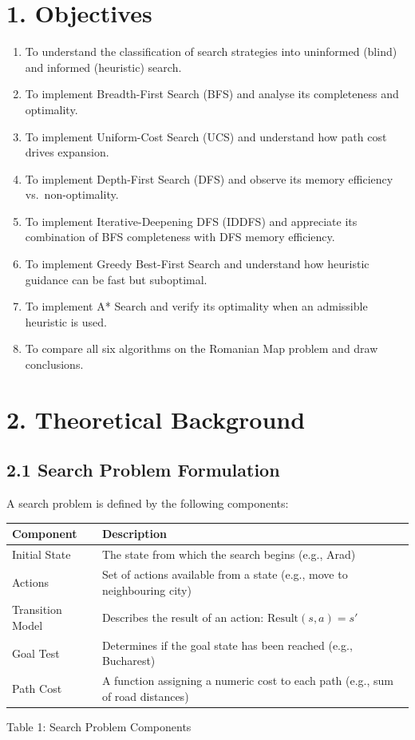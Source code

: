 \documentclass[12pt,a4paper]{article}
\begin{document}
\section*{1. Objectives}

\begin{enumerate}[leftmargin=1.6em]
  \item To understand the classification of search strategies into uninformed (blind) and informed (heuristic) search.
  \item To implement Breadth-First Search (BFS) and analyse its completeness and optimality.
  \item To implement Uniform-Cost Search (UCS) and understand how path cost drives expansion.
  \item To implement Depth-First Search (DFS) and observe its memory efficiency vs.\ non-optimality.
  \item To implement Iterative-Deepening DFS (IDDFS) and appreciate its combination of BFS completeness with DFS memory efficiency.
  \item To implement Greedy Best-First Search and understand how heuristic guidance can be fast but suboptimal.
  \item To implement A* Search and verify its optimality when an admissible heuristic is used.
  \item To compare all six algorithms on the Romanian Map problem and draw conclusions.
\end{enumerate}

\section*{2. Theoretical Background}

\subsection*{2.1 Search Problem Formulation}

A search problem is defined by the following components:

\begin{center}
\begin{tabular}{@{}lp{9.5cm}@{}}
\toprule
\textbf{Component} & \textbf{Description} \\
\midrule
Initial State & The state from which the search begins (e.g., Arad) \\[2pt]
Actions & Set of actions available from a state (e.g., move to neighbouring city) \\[2pt]
Transition Model & Describes the result of an action: $\text{Result}(s,a) = s'$ \\[2pt]
Goal Test & Determines if the goal state has been reached (e.g., Bucharest) \\[2pt]
Path Cost & A function assigning a numeric cost to each path (e.g., sum of road distances) \\
\bottomrule
\end{tabular}
\end{center}
\begin{center}
\small Table 1: Search Problem Components
\end{center}
\end{document}
